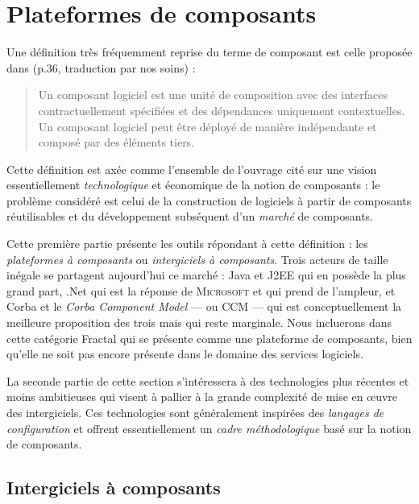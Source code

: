 \section{Plateformes de composants}

Une d\'efinition tr\`es fr\'equemment reprise du terme de composant
est celle propos\'ee  dans \cite{szyperski} (p.36, traduction par nos
soins) : 
\begin{quote}
    \og Un composant logiciel est une unit\'e de composition avec des
    interfaces contractuellement sp\'ecifi\'ees et des
    d\'ependances uniquement contextuelles. Un composant logiciel
    peut \^etre d\'eploy\'e de mani\`ere ind\'ependante et
    compos\'e par des \'el\'ements tiers. \fg
\end{quote}
Cette d\'efinition est
ax\'ee comme l'ensemble de l'ouvrage cit\'e sur une vision
essentiellement \emph{technologique} et \'economique de la notion de
composants :  le 
probl\`eme consid\'er\'e est celui de la construction de logiciels \`a partir de
composants r\'eutilisables et du d\'eveloppement subs\'equent d'un
\emph{march\'e} de composants. 

Cette premi\`ere partie pr\'esente les outils r\'epondant \`a cette d\'efinition : les
\emph{plateformes \`a composants} ou \emph{intergiciels \`a
  composants}. Trois acteurs de taille in\'egale se partagent
aujourd'hui ce march\'e : \textsf{Java} et \textsf{J2EE} qui en
poss\`ede la plus grand part,  \textsf{.Net} qui est la r\'eponse de
\textsc{Microsoft} et qui prend de l'ampleur, et \textsf{Corba} et le
\emph{Corba Component Model} --- ou \textsf{CCM} --- qui est
conceptuellement la meilleure proposition des trois mais qui reste
marginale. Nous incluerons dans cette cat\'egorie \textsf{Fractal}
qui se pr\'esente comme une plateforme de composants, bien qu'elle ne
soit pas encore pr\'esente dans le domaine des services logiciels. 

La seconde partie de cette section s'int\'eressera \`a des
technologies plus r\'ecentes et moins ambitieuses qui visent \`a
pallier \`a la grande complexit\'e de mise en \oe uvre des
intergiciels. Ces technologies sont g\'en\'eralement inspir\'ees
des \emph{langages de configuration} et offrent essentiellement un \emph{cadre
m\'ethodologique} bas\'e sur la notion de composants.

\subsection{Intergiciels \`a composants}

